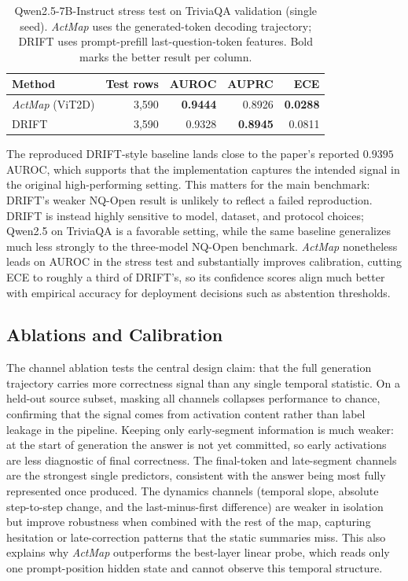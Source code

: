 \documentclass{article}
\newcommand{\actmap}{\textit{ActMap}}
\begin{document}
\begin{table}[H]
\centering
\caption{Qwen2.5-7B-Instruct stress test on TriviaQA validation (single seed). \actmap{} uses the generated-token decoding trajectory; DRIFT uses prompt-prefill last-question-token features. Bold marks the better result per column.}
\begin{tabular}{lrrrr}
\toprule
Method & Test rows & AUROC & AUPRC & ECE \\
\midrule
\actmap{} (ViT2D) & 3,590 & \textbf{0.9444} & 0.8926 & \textbf{0.0288} \\
DRIFT & 3,590 & 0.9328 & \textbf{0.8945} & 0.0811 \\
\bottomrule
\end{tabular}
\label{tab:qwen25}
\end{table}

The reproduced DRIFT-style baseline lands close to the paper's reported \(0.9395\) AUROC, which supports that the implementation captures the intended signal in the original high-performing setting. This matters for the main benchmark: DRIFT's weaker NQ-Open result is unlikely to reflect a failed reproduction. DRIFT is instead highly sensitive to model, dataset, and protocol choices; Qwen2.5 on TriviaQA is a favorable setting, while the same baseline generalizes much less strongly to the three-model NQ-Open benchmark. \actmap{} nonetheless leads on AUROC in the stress test and substantially improves calibration, cutting ECE to roughly a third of DRIFT's, so its confidence scores align much better with empirical accuracy for deployment decisions such as abstention thresholds.

\subsection{Ablations and Calibration}

The channel ablation tests the central design claim: that the full generation trajectory carries more correctness signal than any single temporal statistic. On a held-out source subset, masking all channels collapses performance to chance, confirming that the signal comes from activation content rather than label leakage in the pipeline. Keeping only early-segment information is much weaker: at the start of generation the answer is not yet committed, so early activations are less diagnostic of final correctness. The final-token and late-segment channels are the strongest single predictors, consistent with the answer being most fully represented once produced. The dynamics channels (temporal slope, absolute step-to-step change, and the last-minus-first difference) are weaker in isolation but improve robustness when combined with the rest of the map, capturing hesitation or late-correction patterns that the static summaries miss. This also explains why \actmap{} outperforms the best-layer linear probe, which reads only one prompt-position hidden state and cannot observe this temporal structure.
\end{document}

